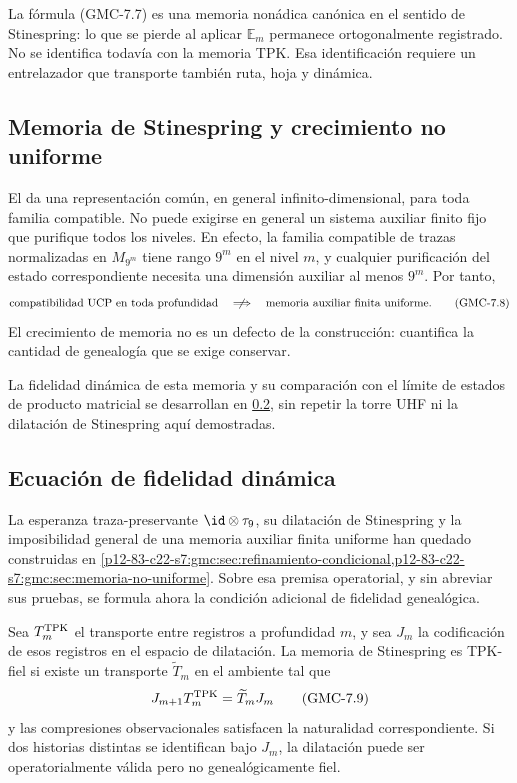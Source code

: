 \begin{bridgebox}
La fórmula \textup{(GMC-7.7)} es una memoria nonádica canónica en el sentido de
Stinespring: lo que se pierde al aplicar $\mathbb E_m$ permanece ortogonalmente
registrado. No se identifica todavía con la memoria TPK. Esa identificación
requiere un entrelazador que transporte también ruta, hoja y dinámica.
\end{bridgebox}

\subsection{Memoria de Stinespring y crecimiento no uniforme}
\label{p12-83-c22-s7:gmc:sec:memoria-no-uniforme}

El  da una representación común, en general
infinito-dimensional, para toda familia compatible. No puede exigirse en
general un sistema auxiliar finito fijo que purifique todos los niveles. En efecto, la
familia compatible de trazas normalizadas en $M_{9^m}$ tiene rango $9^m$ en
el nivel $m$, y cualquier purificación del estado correspondiente necesita
una dimensión auxiliar al menos $9^m$. Por tanto,
\[
 \text{compatibilidad UCP en toda profundidad}
 \quad\centernot\Longrightarrow\quad
 \text{memoria auxiliar finita uniforme}.
 \tag{GMC-7.8}
\]
El crecimiento de memoria no es un defecto de la construcción: cuantifica la
cantidad de genealogía que se exige conservar.

La fidelidad dinámica de esta memoria y su comparación con el límite de
estados de producto matricial se desarrollan en
\cref{p12-83-c22-s7:gmc:sec:fidelidad-dinamica}, sin repetir la torre UHF ni la dilatación
de Stinespring aquí demostradas.
\fi

\ifdefined\HMTGMCContinuumMPS
\subsection{Ecuación de fidelidad dinámica}
\label{p12-83-c22-s7:gmc:sec:fidelidad-dinamica}

La esperanza traza-preservante \(\id\otimes\tau_9\), su dilatación de
Stinespring y la imposibilidad general de una memoria auxiliar finita
uniforme han quedado construidas en
\cref{p12-83-c22-s7:gmc:sec:refinamiento-condicional,p12-83-c22-s7:gmc:sec:memoria-no-uniforme}. Sobre
esa premisa operatorial, y sin abreviar sus pruebas, se formula ahora la
condición adicional de fidelidad genealógica.

Sea $T_m^{\rm TPK}$ el transporte entre registros a profundidad $m$, y sea
$J_m$ la codificación de esos registros en el espacio de dilatación. La
memoria de Stinespring es TPK-fiel si existe un transporte
$\widetilde T_m$ en el ambiente tal que
\[
 J_{m+1}T_m^{\rm TPK}=\widetilde T_mJ_m
 \tag{GMC-7.9}
\]
y las compresiones observacionales satisfacen la naturalidad correspondiente.
Si dos historias distintas se identifican bajo $J_m$, la dilatación puede ser
operatorialmente válida pero no genealógicamente fiel.

